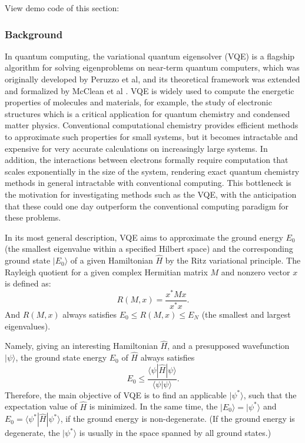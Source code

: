 
View demo code of this section:  \ 

\subsubsection{Background}

In quantum computing, the variational quantum eigensolver (VQE) is a flagship algorithm for solving eigenproblems on near-term quantum computers, which was originally developed by Peruzzo et al, and its theoretical framework was extended and formalized by McClean et al \cite{Peruzzo2014Peruzzo2014}.
VQE is widely used to compute the energetic properties of molecules and materials, for example, the study of electronic structures which is a critical application for quantum chemistry and condensed matter physics.
Conventional computational chemistry provides efficient methods to approximate such properties for small systems, but it becomes intractable and expensive for very accurate calculations on increasingly large systems. In addition, the interactions between electrons formally require computation that scales exponentially in the size of the system, rendering exact quantum chemistry methods in general intractable with conventional computing.
This bottleneck is the motivation for investigating methods such as the VQE, with the anticipation that these could one day outperform the conventional computing paradigm for these problems.

In its most general description, VQE aims to approximate the ground energy $E_0$ (the smallest eigenvalue within a specified Hilbert space) and the corresponding ground state $|E_0\rangle$ of a given Hamiltonian $\hat{H}$ by the Ritz variational principle.
The Rayleigh quotient for a given complex Hermitian matrix $M$ and nonzero vector $x$ is defined as:
\begin{equation}
    R(M,x)=\frac{x^*Mx}{x^*x}.
\end{equation}
And $R(M,x)$ always satisfies $E_0\leq R(M,x)\leq E_N$ (the smallest and largest eigenvalues).

Namely, giving an interesting Hamiltonian $\hat{H}$, and a presupposed wavefunction $|\psi\rangle$, the ground state energy $E_{0}$ of $\hat{H}$ always satisfies
\begin{equation}
    E_0 \leq \frac{\langle \psi |\hat{H}| \psi \rangle}{\langle \psi |\psi\rangle}.
\end{equation}
Therefore, the main objective of VQE is to find an applicable $|\psi^*\rangle$, such that the expectation value of $\hat{H}$ is minimized. In the same time, the $|E_0\rangle = |\psi^*\rangle$ and $E_0 = \langle \psi^* |\hat{H}| \psi^* \rangle$, if the ground energy is non-degenerate. (If the ground energy is degenerate, the $|\psi^*\rangle$ is usually in the space spanned by all ground states.)

